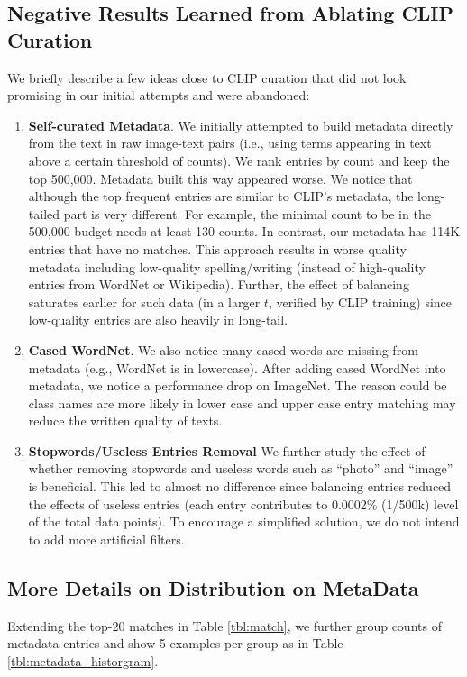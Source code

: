 \documentclass{article} %
\begin{document}
\subsection{Negative Results Learned from Ablating CLIP Curation}
We briefly describe a few ideas close to CLIP curation that did not look promising in our initial attempts and were abandoned:
\begin{enumerate}
	\item \textbf{Self-curated Metadata}. We initially attempted to build metadata directly from the text in raw image-text pairs (i.e., using terms appearing in text above a certain threshold of counts). 
	We rank entries by count and keep the top 500,000. Metadata built this way appeared worse.  We notice that although the top frequent entries are similar to CLIP's metadata, the long-tailed part is very different. For example, the minimal count to be in the 500,000 budget needs at least 130 counts. In contrast, our metadata has 114K entries that have no matches.
	This approach results in worse quality metadata including low-quality spelling/writing (instead of high-quality entries from WordNet or Wikipedia). Further, the effect of balancing saturates earlier for such data (in a larger $t$, verified by CLIP training) since low-quality entries are also heavily in long-tail.
	\item \textbf{Cased WordNet}. We also notice many cased words are missing from metadata (e.g., WordNet is in lowercase). After adding cased WordNet into metadata, we notice a performance drop on ImageNet.
	The reason could be class names are more likely in lower case and upper case entry matching may reduce the written quality of texts.
	\item \textbf{Stopwords/Useless Entries Removal}
	We further study the effect of whether removing stopwords and useless words such as ``photo'' and ``image'' is beneficial. This led to almost no difference since balancing entries reduced the effects of useless entries (each entry contributes to 0.0002\% (1/500k) level of the total data points). To encourage a simplified solution, we do not intend to add more artificial filters. 
 
\end{enumerate}

{\color{black} \subsection{More Details on Distribution on MetaData}
Extending the top-20 matches in Table \ref{tbl:match}, we further group counts of metadata entries and show 5 examples per group as in Table \ref{tbl:metadata_historgram}.}
\end{document}
